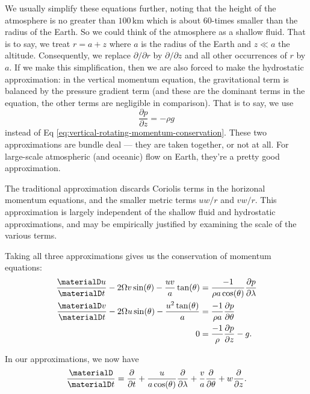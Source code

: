 We usually simplify these equations further, noting that the height of
the atmosphere is no greater than $100\,\mathrm{km}$ which is about
60-times smaller than the radius of the Earth. So we could think of the
atmosphere as a shallow fluid. That is to say, we treat $r=a+z$ where
$a$ is the radius of the Earth and $z\ll a$ the altitude. Consequently,
we replace $\partial/\partial r$ by $\partial/\partial z$ and all other
occurrences of $r$ by $a$. If we make this simplification, then we
are also forced to make the hydrostatic approximation: in the vertical
momentum equation, the gravitational term is balanced by the pressure
gradient term (and these are the dominant terms in the equation, the
other terms are negligible in comparison). That is to say, we use
\begin{equation}
  \frac{\partial p}{\partial z}=-\rho g
\end{equation}
instead of Eq \eqref{eq:vertical-rotating-momentum-conservation}. These
two approximations are bundle deal --- they are taken together, or not
at all. For large-scale atmospheric (and oceanic) flow on Earth, they're
a pretty good approximation.

The traditional approximation discards Coriolis terms in the horizonal
momentum equations, and the smaller metric terms $uw/r$ and
$vw/r$. This approximation is largely independent of the shallow fluid
and hydrostatic approximations, and may be empirically justified by
examining the scale of the various terms.

\begin{prop}
Taking all three approximations gives us the conservation of momentum equations:
\begin{subequations}
  \begin{align}
    \frac{\materialD u}{\materialD t}
    - 2\Omega v\sin(\theta) - \frac{uv}{a}\tan(\theta)
    &= \frac{-1}{\rho a\cos(\theta)}\frac{\partial p}{\partial\lambda}\\
    \frac{\materialD v}{\materialD t}
    - 2\Omega u\sin(\theta) - \frac{u^{2}\tan(\theta)}{a}
    &= \frac{-1}{\rho a}\frac{\partial p}{\partial\theta} \\
    0 &= \frac{-1}{\rho}\frac{\partial p}{\partial z}-g.
  \end{align}
\end{subequations}
\end{prop}

\begin{note}
In our approximations, we now have
\begin{equation}
  \frac{\materialD}{\materialD t}=\frac{\partial}{\partial t} +
  \frac{u}{a\cos(\theta)}\frac{\partial}{\partial\lambda} +
  \frac{v}{a}\frac{\partial}{\partial\theta} + w\frac{\partial}{\partial z}.
\end{equation}
\end{note}

